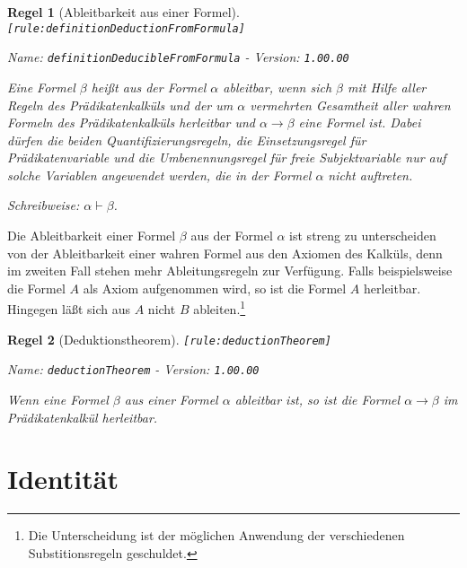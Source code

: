 \documentclass[a4paper,german,10pt,twoside]{book}
\newtheorem{rul}{Regel}
\theoremstyle{definition}
\theoremstyle{remark}
\begin{document}
\begin{rul}[Ableitbarkeit aus einer Formel]
\label{rule:definitionDeductionFromFormula} \hypertarget{rule:definitionDeductionFromFormula}{}
{\tt \tiny [\verb]rule:definitionDeductionFromFormula]]}

\par
{\em   Name: \verb]definitionDeducibleFromFormula]  -  Version: \verb]1.00.00]}


Eine Formel $\beta$ hei{\ss}t \emph{aus der Formel $\alpha$ ableitbar}, wenn sich $\beta$ mit Hilfe aller Regeln des Pr{\"a}dikatenkalk{\"u}ls und der um $\alpha$ vermehrten Gesamtheit aller wahren Formeln des Pr{\"a}dikatenkalk{\"u}ls herleitbar und $\alpha \rightarrow \beta$ eine Formel ist. Dabei d{\"u}rfen die beiden Quantifizierungsregeln, die Einsetzungsregel f{\"u}r Pr{\"a}dikatenvariable und die Umbenennungsregel f{\"u}r freie Subjektvariable nur auf solche Variablen angewendet werden, die in der Formel $\alpha$ nicht auftreten.

\par
Schreibweise: $\alpha \vdash \beta$.
\end{rul}

Die Ableitbarkeit einer Formel $\beta$ aus der Formel $\alpha$ ist streng zu unterscheiden von der Ableitbarkeit einer wahren Formel aus den Axiomen des Kalk{\"u}ls, denn im zweiten Fall stehen mehr Ableitungsregeln zur Verf{\"u}gung. Falls beispielsweise die Formel $A$ als Axiom aufgenommen wird, so ist die Formel $A$ herleitbar. Hingegen l{\"a}{\ss}t sich aus $A$ nicht $B$ ableiten.\footnote{Die Unterscheidung ist der m{\"o}glichen Anwendung der verschiedenen Substitionsregeln geschuldet.}


\begin{rul}[Deduktionstheorem]
\label{rule:deductionTheorem} \hypertarget{rule:deductionTheorem}{}
{\tt \tiny [\verb]rule:deductionTheorem]]}

\par
{\em   Name: \verb]deductionTheorem]  -  Version: \verb]1.00.00]}


Wenn eine Formel $\beta$ aus einer Formel $\alpha$ ableitbar ist, so ist die Formel $\alpha \rightarrow \beta$ im Pr{\"a}dikatenkalk{\"u}l herleitbar.
\end{rul}




\chapter{Identit{\"a}t} \label{chapter7} \hypertarget{chapter7}{}
\end{document}
